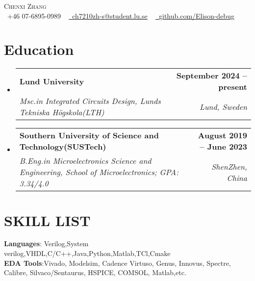 \documentclass[letterpaper,11pt]{article}
\makeatletter
\newcommand{\resumeSubheading}[4]{
	\vspace{-2pt}\item
	\begin{tabular*}{1.0\textwidth}[t]{l@{\extracolsep{\fill}}r}
		\textbf{#1} & \textbf{\small #2} \\
		\textit{\small#3} & \textit{\small #4} \\
	\end{tabular*}\vspace{-7pt}
}
\newcommand{\resumeSubHeadingListStart}{\begin{itemize}[leftmargin=0.0in, label={}]}
\newcommand{\resumeSubHeadingListEnd}{\end{itemize}}
\makeatother
\begin{document}
	
	
	\begin{center}
		{\Huge \scshape Chenxi Zhang} \\ \vspace{1pt}
		\small \raisebox{-0.1\height}\faPhone\ +46 07-6895-0989 ~ \href{mailto:ch7210zh-s@student.lu.se}{\raisebox{-0.2\height}\faEnvelope\  \underline{ch7210zh-s@student.lu.se}} ~ 
		\href{https://github.com/Elison-debug}{\raisebox{-0.2\height}\faGithub\ \underline{github.com/Elison-debug}}
		\vspace{-8pt}
	\end{center}
	
	
	\section{Education}
	\resumeSubHeadingListStart
	\resumeSubheading
	{Lund University}{September 2024 -- present}
	{Msc.in Integrated Circuits Design, Lunds Tekniska Högskola(LTH)}{Lund, Sweden}
	
	\resumeSubheading
	{Southern University of Science and Technology(SUSTech)}{August 2019 -- June 2023}
	{B.Eng.in Microelectronics Science and Engineering, School of Microelectronics; GPA: 3.34/4.0}{ShenZhen, China}
	\resumeSubHeadingListEnd
	

	\section{SKILL LIST}
	\begin{itemize}[leftmargin=0.15in, label={}]
		\small{\item{
				\textbf{Languages}{: Verilog,System verilog,VHDL,C/C++,Java,Python,Matlab,TCl,Cmake} \\
				\textbf{EDA Tools}{:Vivado, Modelsim, Cadence Virtuso, Genus, Innovus, Spectre, Calibre, Silvaco/Sentaurus, HSPICE, COMSOL, Matlab,etc. } \\
		}}
	\end{itemize}
	\vspace{-17pt}
	
\end{document}
